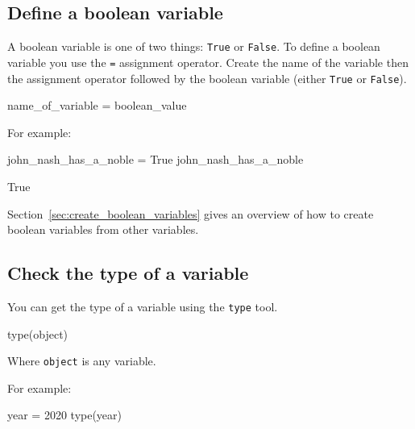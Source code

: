\subsection{Define a boolean variable}
\label{\detokenize{building-tools/01-variables-conditionals-loops/how/main:define-a-boolean-variable}}

A boolean variable is one of two things: \texttt{True} or \texttt{False}. To define a boolean
variable you use the \texttt{=} assignment operator.
Create the name of the variable then the assignment operator followed by the
boolean variable (either \texttt{True} or \texttt{False}).


\begin{pyin}
name_of_variable = boolean_value
\end{pyin}



For example:




\begin{pyin}
john_nash_has_a_noble = True
john_nash_has_a_noble
\end{pyin}





\begin{pyin}
True
\end{pyin}


\begin{note}
Section~\ref{sec:create_boolean_variables} gives an overview of how to create boolean
variables from other variables.
\end{note}



\subsection{Check the type of a variable}

You can get the type of a variable using the \texttt{type} tool.


\begin{pyin}
type(object)
\end{pyin}


Where \texttt{object} is any variable.



For example:




\begin{pyin}
year = 2020
type(year)
\end{pyin}





